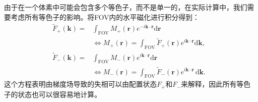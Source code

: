 由于在一个体素中可能会包含多个等色子，而不是单一的，在实际计算中，我们需要考虑所有等色子的影响。将FOV内的水平磁化进行积分得到：
\begin{align} \tilde{F}_+(\textbf{k})=&\int_{\mathrm{FOV}}M_+(\textbf{r})e^{-i\textbf{k} \cdot \textbf{r}}\mathrm{d}\textbf{r} \nonumber\\ &\Longleftrightarrow M_+(\textbf{r})=\int_{\mathrm{FOV}}\tilde{F}_+(\textbf{r})e^{i\textbf{k} \cdot \textbf{r}}\mathrm{d}\textbf{k},\end{align}
 \begin{align} \tilde{F}_-(\textbf{k})=&\int_{\mathrm{FOV}}M_-(\textbf{r})e^{i\textbf{k} \cdot \textbf{r}}\mathrm{d}\textbf{r}\nonumber\\ &\Longleftrightarrow M_-(\textbf{r})=\int_{\mathrm{FOV}}\tilde{F}_-(\textbf{r})e^{i\textbf{k} \cdot \textbf{r}}\,\mathrm{d}\textbf{k}.\end{align}
 这个方程表明由梯度场导致的失相可以由配置状态$F_+$和$F_-$来解释，因此所有等色子的状态也可以很容易地计算。

